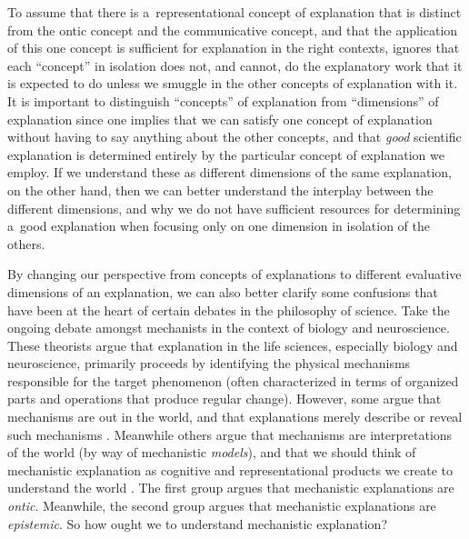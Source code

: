 To assume that there is a~representational concept of explanation that is distinct from the ontic concept and the communicative concept, and that the application of this one concept is sufficient for explanation in the right contexts, ignores that each ``concept'' in isolation does not, and cannot, do the explanatory work that it is expected to do unless we smuggle in the other concepts of explanation with it. It is important to distinguish ``concepts'' of explanation from ``dimensions'' of explanation since one implies that we can satisfy one concept of explanation without having to say anything about the other concepts, and that \textit{good} scientific explanation is determined entirely by the particular concept of explanation we employ. If we understand these as different dimensions of the same explanation, on the other hand, then we can better understand the interplay between the different dimensions, and why we do not have sufficient resources for determining a~good explanation when focusing only on one dimension in isolation of the others.

By changing our perspective from concepts of explanations to different evaluative dimensions of an explanation, we can also better clarify some confusions that have been at the heart of certain debates in the philosophy of science. Take the ongoing debate amongst mechanists in the context of biology and neuroscience. These theorists argue that explanation in the life sciences, especially biology and neuroscience, primarily proceeds by identifying the physical mechanisms responsible for the target phenomenon (often characterized in terms of organized parts and operations that produce regular change). However, some argue that mechanisms are out in the world, and that explanations merely describe or reveal such mechanisms
\parencites[][]{machamer_thinking_2000}[][]{craver_when_2006}[][]{kaplan_explanation_2011}[][]{strevens_depth_2011}[][]{craver_search_2013}. %
 Meanwhile others argue that mechanisms are interpretations of the world (by way of mechanistic \textit{models}), and that we should think of mechanistic explanation as cognitive and representational products we create to understand the world 
\parencites[][]{chirimuuta_minimal_2014}[][]{bechtel_can_2015}[][]{wright_ontic_2015}[][]{austin_philosophy_2017}. %
 The first group argues that mechanistic explanations are \textit{ontic}. Meanwhile, the second group argues that mechanistic explanations are \textit{epistemic}. So how ought we to understand mechanistic explanation?

